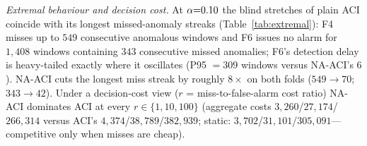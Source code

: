 \begin{table}[t]
\caption{Alarm-budget defect and NA-ACI at $\alphaNom{=}0.10$ (3 seeds). Mean gap is over four nominal levels. NA-ACI reallocates alarms to anomalies (columns Det.) at essentially unchanged normal-window FPR, with large range-$F_1$ gains on anomaly-rich folds; $\kappa{=}3$ is aggressive, $\kappa{=}5$ conservative.}
\label{tab:na}
\centering
\small
{}
\end{table}

\emph{Extremal behaviour and decision cost.} At $\alphaNom{=}0.10$ the blind stretches of plain ACI coincide with its longest missed-anomaly streaks (Table~\ref{tab:extremal}): F4 misses up to $549$ consecutive anomalous windows and F6 issues no alarm for $1{,}408$ windows containing $343$ consecutive missed anomalies; F6's detection delay is heavy-tailed exactly where it oscillates (P95 $=309$ windows versus NA-ACI's $6$). NA-ACI cuts the longest miss streak by roughly $8\times$ on both folds ($549\!\to\!70$; $343\!\to\!42$). Under a decision-cost view ($r$ = miss-to-false-alarm cost ratio) NA-ACI dominates ACI at every $r\in\{1,10,100\}$ (aggregate costs $3{,}260$/$27{,}174$/$266{,}314$ versus ACI's $4{,}374$/$38{,}789$/$382{,}939$; static: $3{,}702$/$31{,}101$/$305{,}091$---competitive only when misses are cheap).

